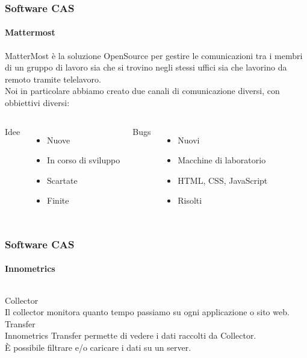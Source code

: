 \documentclass{beamer}
\begin{document}
\begin{frame}
\frametitle{Software CAS}
\framesubtitle{Mattermost}
MatterMost è la soluzione OpenSource per gestire le comunicazioni tra i membri di un gruppo di lavoro sia che si trovino negli stessi uffici sia che lavorino da remoto tramite telelavoro.\\
\vspace{0.2cm}
Noi in particolare abbiamo creato due canali di comunicazione diversi, con obbiettivi diversi:
\vspace{0.2cm}
\begin{columns}
\centering
Idee
  \begin{itemize}
	\item Nuove
	\item In corso di sviluppo
	\item Scartate
	\item Finite
  \end{itemize}
\centering
Bugs
  \begin{itemize}
	\item Nuovi
	\item Macchine di laboratorio
	\item HTML, CSS, JavaScript
	\item Risolti
  \end{itemize}
\end{columns}
\end{frame}


\begin{frame}
\frametitle{Software CAS}
\framesubtitle{Innometrics}
\begin{columns}
Collector\\
Il collector monitora quanto tempo passiamo su ogni applicazione o sito web.
Transfer\\
Innometrics Transfer permette di vedere i dati raccolti da Collector.\\
È possibile filtrare e/o caricare i dati su un server.
\end{columns}
\end{frame}
\end{document}
